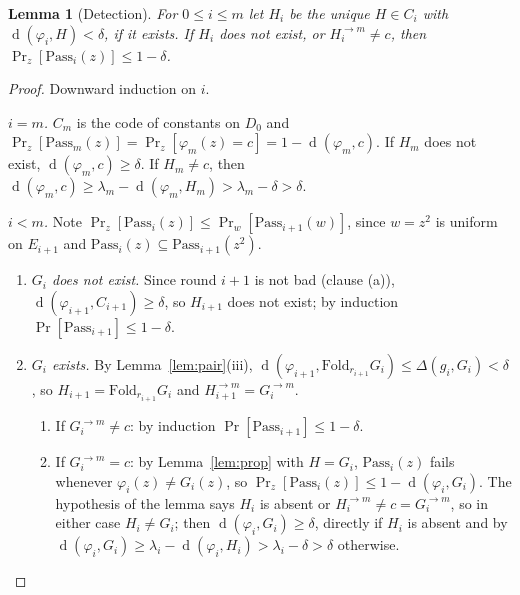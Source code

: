 \documentclass[11pt]{article}
\newtheorem{lemma}[theorem]{Lemma}
\theoremstyle{definition}
\newcommand{\Fold}{\mathrm{Fold}}
\DeclareMathOperator{\dist}{d}
\begin{document}
\begin{lemma}[Detection]\label{lem:detect}
For $0\le i\le m$ let $H_i$ be the unique $H\in C_i$ with $\dist(\varphi_i,H)<\delta$, if it exists. If $H_i$ does not exist, or $H_i^{\to m}\ne c$, then $\Pr_z[\mathrm{Pass}_i(z)]\le1-\delta$.
\end{lemma}
\begin{proof}
Downward induction on $i$.

\emph{$i=m$.} $C_m$ is the code of constants on $D_0$ and $\Pr_z[\mathrm{Pass}_m(z)]=\Pr_z[\varphi_m(z)=c]=1-\dist(\varphi_m,c)$. If $H_m$ does not exist, $\dist(\varphi_m,c)\ge\delta$. If $H_m\ne c$, then $\dist(\varphi_m,c)\ge\lambda_m-\dist(\varphi_m,H_m)>\lambda_m-\delta>\delta$.

\emph{$i<m$.} Note $\Pr_z[\mathrm{Pass}_i(z)]\le\Pr_w[\mathrm{Pass}_{i+1}(w)]$, since $w=z^2$ is uniform on $E_{i+1}$ and $\mathrm{Pass}_i(z)\subseteq\mathrm{Pass}_{i+1}(z^2)$.
\begin{enumerate}[label=\arabic*.,leftmargin=*]
\item \emph{$G_i$ does not exist.} Since round $i+1$ is not bad (clause (a)), $\dist(\varphi_{i+1},C_{i+1})\ge\delta$, so $H_{i+1}$ does not exist; by induction $\Pr[\mathrm{Pass}_{i+1}]\le1-\delta$.
\item \emph{$G_i$ exists.} By Lemma~\ref{lem:pair}(iii), $\dist(\varphi_{i+1},\Fold_{r_{i+1}}G_i)\le\Delta(g_i,G_i)<\delta$, so $H_{i+1}=\Fold_{r_{i+1}}G_i$ and $H_{i+1}^{\to m}=G_i^{\to m}$.
\begin{enumerate}[label=2\alph*.]
\item If $G_i^{\to m}\ne c$: by induction $\Pr[\mathrm{Pass}_{i+1}]\le1-\delta$.
\item If $G_i^{\to m}=c$: by Lemma~\ref{lem:prop} with $H=G_i$, $\mathrm{Pass}_i(z)$ fails whenever $\varphi_i(z)\ne G_i(z)$, so $\Pr_z[\mathrm{Pass}_i(z)]\le1-\dist(\varphi_i,G_i)$. The hypothesis of the lemma says $H_i$ is absent or $H_i^{\to m}\ne c=G_i^{\to m}$, so in either case $H_i\ne G_i$; then $\dist(\varphi_i,G_i)\ge\delta$, directly if $H_i$ is absent and by $\dist(\varphi_i,G_i)\ge\lambda_i-\dist(\varphi_i,H_i)>\lambda_i-\delta>\delta$ otherwise.\qedhere
\end{enumerate}
\end{enumerate}
\end{proof}
\end{document}
